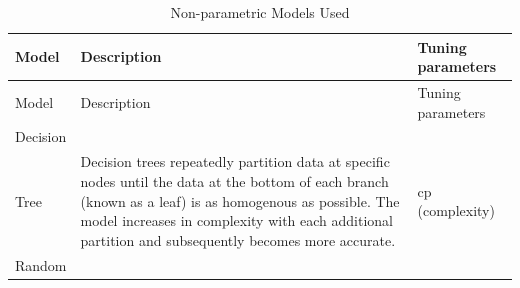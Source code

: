 \documentclass[11pt,]{article}
\begin{document}
\begin{longtable}[]{@{}lll@{}}
\caption{Non-parametric Models Used}\tabularnewline
\toprule
\begin{minipage}[b]{0.05\columnwidth}\raggedright
Model\strut
\end{minipage} & \begin{minipage}[b]{0.73\columnwidth}\raggedright
Description\strut
\end{minipage} & \begin{minipage}[b]{0.13\columnwidth}\raggedright
Tuning parameters\strut
\end{minipage}\tabularnewline
\midrule
\endfirsthead
\toprule
\begin{minipage}[b]{0.05\columnwidth}\raggedright
Model\strut
\end{minipage} & \begin{minipage}[b]{0.73\columnwidth}\raggedright
Description\strut
\end{minipage} & \begin{minipage}[b]{0.13\columnwidth}\raggedright
Tuning parameters\strut
\end{minipage}\tabularnewline
\midrule
\endhead
\begin{minipage}[t]{0.05\columnwidth}\raggedright
Decision\strut
\end{minipage} & \begin{minipage}[t]{0.73\columnwidth}\raggedright
\strut
\end{minipage} & \begin{minipage}[t]{0.13\columnwidth}\raggedright
\strut
\end{minipage}\tabularnewline
\begin{minipage}[t]{0.05\columnwidth}\raggedright
Tree\strut
\end{minipage} & \begin{minipage}[t]{0.73\columnwidth}\raggedright
Decision trees repeatedly partition data at specific nodes until the
data at the bottom of each branch (known as a leaf) is as homogenous as
possible. The model increases in complexity with each additional
partition and subsequently becomes more accurate.\strut
\end{minipage} & \begin{minipage}[t]{0.13\columnwidth}\raggedright
cp (complexity)\strut
\end{minipage}\tabularnewline
\begin{minipage}[t]{0.05\columnwidth}\raggedright
Random\strut
\end{minipage} & \begin{minipage}[t]{0.73\columnwidth}\raggedright

\end{minipage}
\end{longtable}
\end{document}
